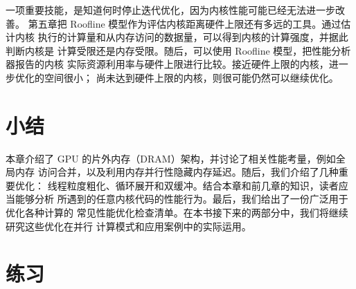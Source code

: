 一项重要技能，是知道何时停止迭代优化，因为内核性能可能已经无法进一步改善。
第五章把 Roofline 模型作为评估内核距离硬件上限还有多远的工具。通过估计内核
执行的计算量和从内存访问的数据量，可以得到内核的计算强度，并据此判断内核是
计算受限还是内存受限。随后，可以使用 Roofline 模型，把性能分析器报告的内核
实际资源利用率与硬件上限进行比较。接近硬件上限的内核，进一步优化的空间很小；
尚未达到硬件上限的内核，则很可能仍然可以继续优化。

\section{小结}
\label{sec:chapter-6-summary}

本章介绍了 GPU 的片外内存（DRAM）架构，并讨论了相关性能考量，例如全局内存
访问合并，以及利用内存并行性隐藏内存延迟。随后，我们介绍了几种重要优化：
线程粒度粗化、循环展开和双缓冲。结合本章和前几章的知识，读者应当能够分析
所遇到的任意内核代码的性能行为。最后，我们给出了一份广泛用于优化各种计算的
常见性能优化检查清单。在本书接下来的两部分中，我们将继续研究这些优化在并行
计算模式和应用案例中的实际运用。

\section*{练习}

